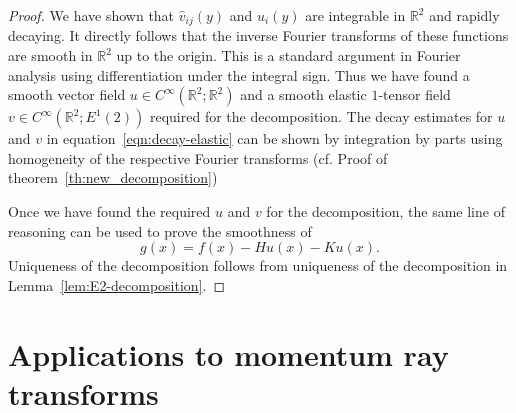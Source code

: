 \documentclass[11pt]{article}
\newcommand{\abs}[1]{\lvert #1 \rvert}
\newcommand{\Rb}{\mathbb{R}}
\renewcommand{\d}{\mathrm{d}}
\newtheorem{theorem}{Theorem}[]
\newcommand{\ssc}[1]{\begin{quotation}\textbf{\color{blue}Suman's comment:\
		}{\color{blue}\textit{#1}}\end{quotation}}
\begin{document}
\begin{proof}
We have shown that $\widehat v_{ij}(y)$ and $\widehat u_i(y)$ are integrable in $\mathbb{R}^2$ and rapidly decaying. It directly follows that the inverse Fourier transforms of these functions are smooth in $\mathbb{R}^2$ up to the origin. This is a standard argument in Fourier analysis using differentiation under the integral sign. Thus we have found a smooth vector field $u \in C^\infty(\mathbb{R}^2;\mathbb{R}^2)$ and a smooth elastic $1$-tensor field $v \in C^\infty(\mathbb{R}^2;E^1(2))$ required for the decomposition. The decay estimates for $u$ and $v$ in equation~\eqref{eqn:decay-elastic} can be shown by integration by parts using homogeneity of the respective Fourier transforms (cf. Proof of theorem~\ref{th:new_decomposition})

Once we have found the required $u$ and $v$ for the decomposition, the same line of reasoning can be used to prove the smoothness of
\begin{equation}
g(x) = f(x) - Hu(x) - Ku(x).
\end{equation}
Uniqueness of the decomposition follows from uniqueness of the decomposition in Lemma~\ref{lem:E2-decomposition}.
\end{proof}




\section{Applications to  momentum ray transforms}\label{sec:Application to moments} 
\end{document}
